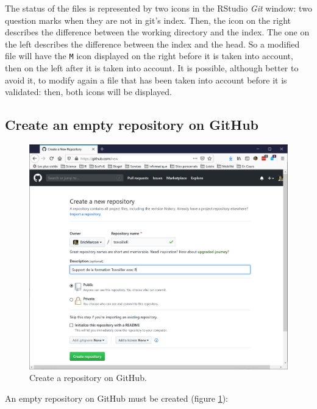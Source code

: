 \documentclass[
  12pt,
  american,
  a4paper,
  extrafontsizes,onecolumn,openright
  ]{memoir}
\begin{document}
\normalsize

The status of the files is represented by two icons in the RStudio \emph{Git} window: two question marks when they are not in git's index.
Then, the icon on the right describes the difference between the working directory and the index.
The one on the left describes the difference between the index and the head.
So a modified file will have the \texttt{M} icon displayed on the right before it is taken into account, then on the left after it is taken into account.
It is possible, although better to avoid it, to modify again a file that has been taken into account before it is validated: then, both icons will be displayed.

\hypertarget{create-an-empty-repository-on-github}{%
\subsection{Create an empty repository on GitHub}\label{create-an-empty-repository-on-github}}



\scriptsize

\begin{figure}

{\centering \includegraphics[width=0.8\linewidth]{images/CreateRepo} 

}

\caption{Create a repository on GitHub.}\label{fig:CreateRepo}
\end{figure}

\normalsize

An empty repository on GitHub must be created (figure \ref{fig:CreateRepo}):
\end{document}
